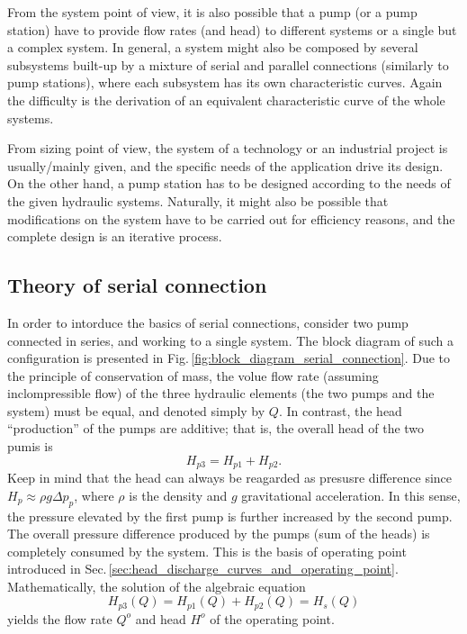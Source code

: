 From the system point of view, it is also possible that a pump (or a pump station) have to provide flow rates (and head) to different systems or a single but a complex system. In general, a system might also be composed by several subsystems built-up by a mixture of serial and parallel connections (similarly to pump stations), where each subsystem has its own characteristic curves. Again the difficulty is the derivation of an equivalent characteristic curve of the whole systems.

From sizing point of view, the system of a technology or an industrial project is usually/mainly given, and the specific needs of the application drive its design. On the other hand, a pump station has to be designed according to the needs of the given hydraulic systems. Naturally, it might also be possible that modifications on the system have to be carried out for efficiency reasons, and the complete design is an iterative process.

\subsection{Theory of serial connection}
In order to intorduce the basics of serial connections, consider two pump connected in series, and working to a single system. The block diagram of such a configuration is presented in Fig.\,\ref{fig:block_diagram_serial_connection}. Due to the principle of conservation of mass, the volue flow rate (assuming inclompressible flow) of the three hydraulic elements (the two pumps and the system) must be equal, and denoted simply by $Q$. In contrast, the head ``production'' of the pumps are additive; that is, the overall head of the two pumis is
%
\begin{equation}
H_{p3} = H_{p1} + H_{p2}.
\end{equation}
%
Keep in mind that the head can always be reagarded as presusre difference since $H_p \approx \rho g \Delta p_p$, where $\rho$ is the density and $g$ gravitational acceleration. In this sense, the pressure elevated by the first pump is further increased by the second pump. The overall pressure difference produced by the pumps (sum of the heads) is completely consumed by the system. This is the basis of operating point introduced in Sec.\,\ref{sec:head_discharge_curves_and_operating_point}. Mathematically, the solution of the algebraic equation
%
\begin{equation} \label{principle_of_serial_connection}
H_{p3}(Q) = H_{p1}(Q) + H_{p2}(Q) = H_s(Q)
\end{equation}
%
yields the flow rate $Q^o$ and head $H^o$ of the operating point.

